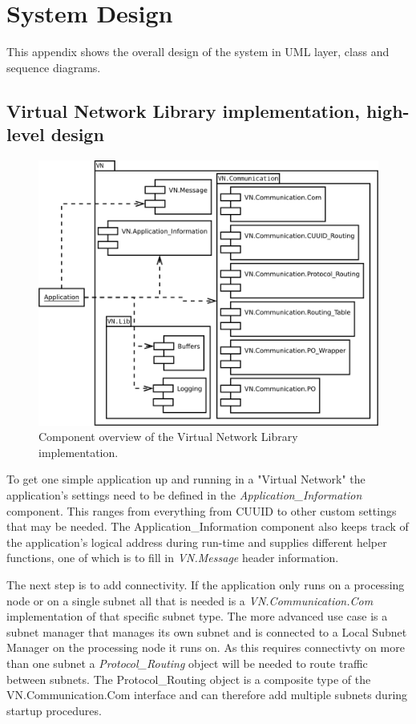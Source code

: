 \chapter{System Design}\label{ch:appendix_design}
This appendix shows the overall design of the system in UML layer, class and
sequence diagrams.

\section{Virtual Network Library implementation, high-level
design}\label{sec:layered_design}

\begin{figure}[h]
    \centering
    \includegraphics[width=\textwidth]{figures/appendix_component_overview}
    \caption{Component overview of the Virtual Network Library implementation.}
    \label{fig:appendix_component_overview}
\end{figure}

To get one simple application up and running in a "Virtual Network" the
application's settings need to be defined in the \emph{Application\_Information}
component. This ranges from everything from CUUID to other custom settings that
may be needed. The Application\_Information component also keeps track of the
application's logical address during run-time and supplies different helper
functions, one of which is to fill in \emph{VN.Message} header information.

The next step is to add connectivity. If the application only runs on a
processing node or on a single subnet all that is needed is a
\emph{VN.Communication.Com} implementation of that specific subnet type. The
more advanced use case is a subnet manager that manages its own subnet and is
connected to a Local Subnet Manager on the processing node it runs on. As this
requires connectivty on more than one subnet a \emph{Protocol\_Routing} object
will be needed to route traffic between subnets. The Protocol\_Routing object
is a composite type of the VN.Communication.Com interface and can
therefore add multiple subnets during startup procedures.

